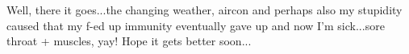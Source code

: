 \begin{post}
	\begin{content}
Well, there it goes...the changing weather, aircon and perhaps also my stupidity caused that my f-ed up immunity eventually gave up and now I'm sick...sore throat + muscles, yay! Hope it gets better soon...
	\end{content}
\end{post}
